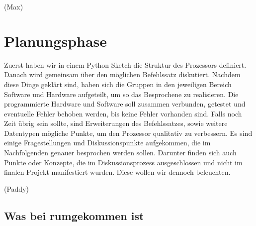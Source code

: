 \documentclass[paper=a4,fontsize=12pt,twocolumn]{scrreprt}
\begin{document}

(Max)

\chapter{Planungsphase}
\label{chap:Planungsphase}

Zuerst haben wir in einem Python Sketch die Struktur des Prozessors definiert.
Danach wird gemeinsam über den möglichen Befehlssatz diskutiert.
Nachdem diese Dinge geklärt sind, haben sich die Gruppen in den jeweiligen Bereich Software und Hardware aufgeteilt, um so das Besprochene zu realisieren.
Die programmierte Hardware und Software soll zusammen verbunden, getestet und eventuelle Fehler behoben werden, bis keine Fehler vorhanden sind.
Falls noch Zeit übrig sein sollte, sind Erweiterungen des Befehlssatzes, sowie weitere Datentypen mögliche Punkte, um den Prozessor qualitativ zu verbessern.
Es sind einige Fragestellungen und Diskussionspunkte aufgekommen, die im Nachfolgenden genauer besprochen werden sollen.
Darunter finden sich auch Punkte oder Konzepte, die im Diskussionsprozess ausgeschlossen und nicht im finalen Projekt manifestiert wurden.
Diese wollen wir dennoch beleuchten.


(Paddy)

\section{Was bei rumgekommen ist}


\end{document}

